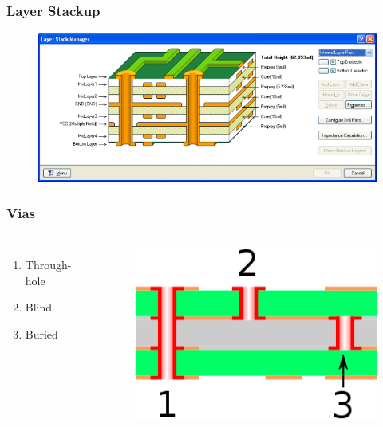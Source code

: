 \documentclass{beamer}
\begin{document}

\begin{frame}
\frametitle{Layer Stackup}

\begin{figure}
\includegraphics[width=0.8\linewidth]{stackup.png}
\end{figure}

\end{frame}

\begin{frame}
\frametitle{Vias}
\begin{columns}[c] %

\begin{enumerate}
\item Through-hole
\item Blind
\item Buried
\end{enumerate}

\begin{figure}
\includegraphics[width=0.8\linewidth]{vias.png}
\end{figure}

\end{columns}
\end{frame}
\end{document}
